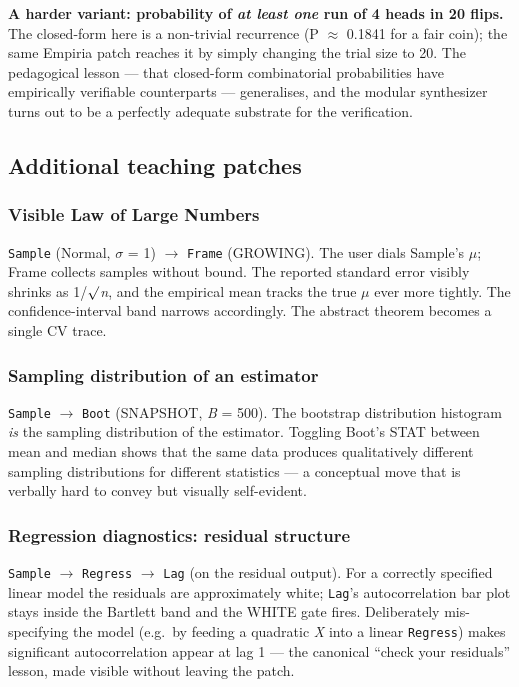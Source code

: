 \textbf{A harder variant: probability of \emph{at least one} run of 4
heads in 20 flips.} The closed-form here is a non-trivial recurrence (P
\ensuremath{\approx} 0.1841 for a fair coin); the same Empiria patch reaches it by simply
changing the trial size to 20. The pedagogical lesson --- that
closed-form combinatorial probabilities have empirically verifiable
counterparts --- generalises, and the modular synthesizer turns out to
be a perfectly adequate substrate for the verification.

\subsection{Additional teaching
patches}\label{additional-teaching-patches}

\subsubsection{Visible Law of Large
Numbers}\label{visible-law-of-large-numbers}

\texttt{Sample} (Normal, \ensuremath{\sigma} = 1) $\rightarrow$ \texttt{Frame} (GROWING). The user
dials Sample's \ensuremath{\mu}; Frame collects samples without bound. The reported
standard error visibly shrinks as 1/\ensuremath{\surd}\emph{n}, and the empirical mean
tracks the true \ensuremath{\mu} ever more tightly. The confidence-interval band
narrows accordingly. The abstract theorem becomes a single CV trace.

\subsubsection{Sampling distribution of an
estimator}\label{sampling-distribution-of-an-estimator}

\texttt{Sample} $\rightarrow$ \texttt{Boot} (SNAPSHOT, \emph{B} = 500). The
bootstrap distribution histogram \emph{is} the sampling distribution of
the estimator. Toggling Boot's STAT between mean and median shows that
the same data produces qualitatively different sampling distributions
for different statistics --- a conceptual move that is verbally hard to
convey but visually self-evident.

\subsubsection{Regression diagnostics: residual
structure}\label{regression-diagnostics-residual-structure}

\texttt{Sample} $\rightarrow$ \texttt{Regress} $\rightarrow$ \texttt{Lag} (on the residual
output). For a correctly specified linear model the residuals are
approximately white; \texttt{Lag}'s autocorrelation bar plot stays
inside the Bartlett band and the WHITE gate fires. Deliberately
mis-specifying the model (e.g.~by feeding a quadratic \emph{X} into a
linear \texttt{Regress}) makes significant autocorrelation appear at lag
1 --- the canonical ``check your residuals'' lesson, made visible
without leaving the patch.

